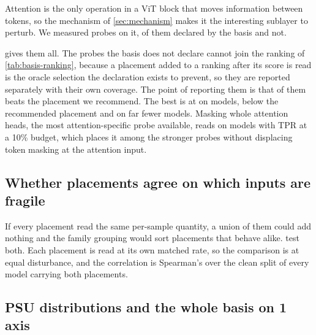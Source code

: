 Attention is the only operation in a ViT block that moves information between tokens, so the mechanism of \cref{sec:mechanism} makes it the interesting sublayer to perturb. We measured \AttentionProbesTotal{} probes on it, \AttentionProbesInBasis{} of them declared by the basis and \AttentionProbesOutsideBasis{} not.

 gives them all. The probes the basis does not declare cannot join the ranking of \cref{tab:basis-ranking}, because a placement added to a ranking after its score is read is the oracle selection the declaration exists to prevent, so they are reported separately with their own coverage. The point of reporting them is that \AttentionProbesBeatingRecommended{} of them beats the placement we recommend. The best is \AttentionProbesBestOutsideName{} at \AttentionProbesBestOutside{} on \AttentionProbesBestOutsideN{} models, below the recommended placement and on far fewer models. Masking whole attention heads, the most attention-specific probe available, reads \AttentionHeadMaskAuroc{} on \AttentionHeadMaskN{} models with \AttentionHeadMaskTprTen{} TPR at a 10\% budget, which places it among the stronger probes without displacing token masking at the attention input.


\FloatBarrier


\subsection{Whether placements agree on which inputs are fragile}
\label{app:agreement}

If every placement read the same per-sample quantity, a union of them could add nothing and the family grouping would sort placements that behave alike.  test both. Each placement is read at its own matched rate, so the comparison is at equal disturbance, and the correlation is Spearman's over the clean split of every model carrying both placements.



\FloatBarrier


\subsection{PSU distributions and the whole basis on 1 axis}
\label{app:distributions}

